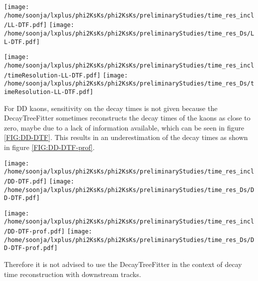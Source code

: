 \begin{center}
\texttt{[image: /home/soonja/lxplus/phi2KsKs/phi2KsKs/preliminaryStudies/time\_res\_incl/LL-DTF.pdf]}
\texttt{[image: /home/soonja/lxplus/phi2KsKs/phi2KsKs/preliminaryStudies/time\_res\_Ds/LL-DTF.pdf]}
\label{FIG:LL-DTF}


\texttt{[image: /home/soonja/lxplus/phi2KsKs/phi2KsKs/preliminaryStudies/time\_res\_incl/timeResolution-LL-DTF.pdf]}
\texttt{[image: /home/soonja/lxplus/phi2KsKs/phi2KsKs/preliminaryStudies/time\_res\_Ds/timeResolution-LL-DTF.pdf]}
\label{FIG:timeres-LL-DTF}

\end{center}


For DD kaons, sensitivity on the decay times is not given because the DecayTreeFitter sometimes reconstructs the decay times of the kaons as close to zero, maybe due to a lack of information available, which can be seen in figure \ref{FIG:DD-DTF}. This results in an underestimation of the decay times as shown in figure \ref{FIG:DD-DTF-prof}.

\begin{center}
\texttt{[image: /home/soonja/lxplus/phi2KsKs/phi2KsKs/preliminaryStudies/time\_res\_incl/DD-DTF.pdf]}
\texttt{[image: /home/soonja/lxplus/phi2KsKs/phi2KsKs/preliminaryStudies/time\_res\_Ds/DD-DTF.pdf]}
\label{FIG:DD-DTF}

\texttt{[image: /home/soonja/lxplus/phi2KsKs/phi2KsKs/preliminaryStudies/time\_res\_incl/DD-DTF-prof.pdf]}
\texttt{[image: /home/soonja/lxplus/phi2KsKs/phi2KsKs/preliminaryStudies/time\_res\_Ds/DD-DTF-prof.pdf]}
\label{FIG:DD-DTF-prof}
\end{center}
Therefore it is not advised to use the DecayTreeFitter in the context of decay time reconstruction with downstream tracks.

